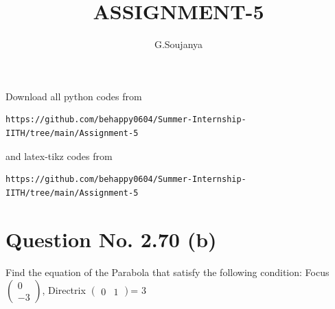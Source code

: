 \documentclass[journal,12pt,twocolumn]{IEEEtran}
\newcommand{\myvec}[1]{\ensuremath{\begin{pmatrix}#1\end{pmatrix}}}
\begin{document}
     \def\topbox#1{\raisebox{-\baselineskip}[0in][0in]{#1}}
     \def\midbox#1{\raisebox{-0.5\baselineskip}[0in][0in]{#1}}
\vspace{3cm}
\title{ASSIGNMENT-5}
\author{G.Soujanya}
\maketitle
\newpage
\bigskip
\renewcommand{\thefigure}{\theenumi}
\renewcommand{\thetable}{\theenumi}
Download all python codes from 
\begin{lstlisting}
https://github.com/behappy0604/Summer-Internship-IITH/tree/main/Assignment-5
\end{lstlisting}
%
and latex-tikz codes from 
%
\begin{lstlisting}
https://github.com/behappy0604/Summer-Internship-IITH/tree/main/Assignment-5
\end{lstlisting}
%
\section{Question No. 2.70 (b)} 
Find the equation of the Parabola that satisfy the following condition:
Focus $\myvec{0\\-3}$, Directrix $\myvec{0 & 1}$= 3
\end{document}
